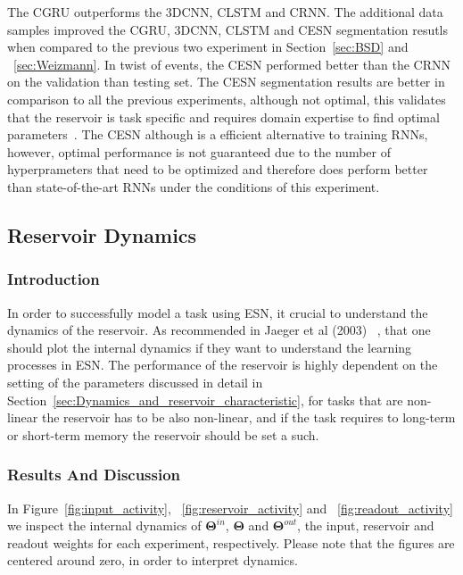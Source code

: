 \documentclass{WitsPhysicsReport}
\begin{document}
 The CGRU outperforms the 3DCNN, CLSTM and CRNN. The additional data samples improved the CGRU, 3DCNN, CLSTM and CESN segmentation resutls when compared to the previous two experiment in Section~\ref{sec:BSD} and ~\ref{sec:Weizmann}. In twist of events, the CESN performed better than the CRNN on the validation than testing set. The CESN segmentation results are better in comparison to all the previous experiments, although not optimal, this validates that the reservoir is task specific and requires domain expertise to find optimal parameters~\cite{jaeger2002tutorial,lukovsevivcius2009reservoir}. The CESN although is a efficient alternative to training RNNs, however, optimal performance is not guaranteed due to the number of hyperprameters that need to be optimized and therefore does perform better than state-of-the-art RNNs under the conditions of this experiment.

\subsection{Reservoir Dynamics}
\label{sec:reservoir_dynamics}

\subsubsection{Introduction}

In order to successfully model a task using ESN, it crucial to understand the dynamics of the reservoir. As recommended in Jaeger et al (2003) ~\citep{jaeger2002tutorial}, that one should plot the internal dynamics if they want to understand the learning processes in ESN. The performance of the reservoir is highly dependent on the setting of the parameters discussed in detail in Section~\ref{sec:Dynamics_and_reservoir_characteristic}, for tasks that are non-linear the reservoir has to be also non-linear, and if the task requires to long-term or short-term memory the reservoir should be set a such. 
\subsubsection{Results And Discussion}

In Figure~\ref{fig:input_activity}, ~\ref{fig:reservoir_activity} and ~\ref{fig:readout_activity} we inspect the internal dynamics of ${\mathbf{\Theta}}^{in}$, ${\mathbf{\Theta}}$ and ${\mathbf{\Theta}}^{out}$, the input, reservoir and readout weights for each experiment, respectively. Please note that the figures are centered around zero,  in order to interpret dynamics.
\end{document}
